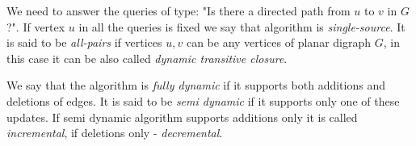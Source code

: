 We need to answer the queries of type: "Is there a directed path from $u$ to $v$ in $G$?". If vertex $u$ in all the queries is fixed we say that algorithm is \textit{single-source}. It is said to be \textit{all-pairs} if vertices $u, v$ can be any vertices of planar digraph $G$, in this case it can be also called \textit{dynamic transitive closure}.

We say that the algorithm is \textit{fully dynamic} if it supports both additions and deletions of edges. It is said to be \textit{semi dynamic} if it supports only one of these updates. If semi dynamic algorithm supports additions only it is called \textit{incremental}, if deletions only - \textit{decremental}.





